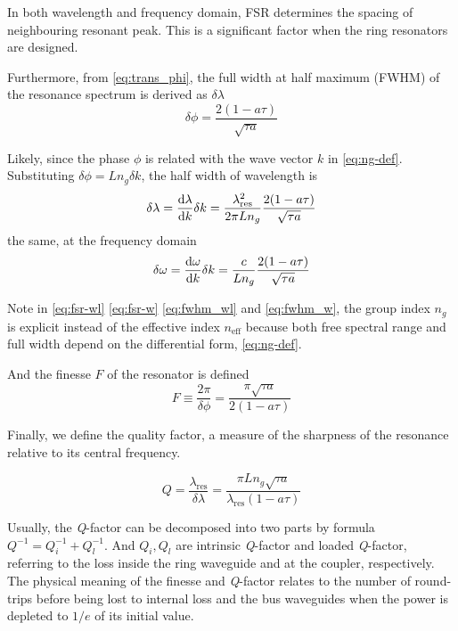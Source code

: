 In both wavelength and frequency domain, FSR determines the spacing of neighbouring resonant peak. This is a significant factor when the ring resonators are designed.

Furthermore, from \autoref{eq:trans_phi}, the full width at half maximum (FWHM) of the resonance spectrum is derived as $\delta\lambda$
\begin{equation}\label{eq:fwhm_phi}
    \delta\phi = \frac{2(1- a \tau)}{\sqrt{\tau a}}
\end{equation}
\begin{figure}
    \centering
    
    \label{fig:my_label}
\end{figure}

Likely, since the phase $\phi$ is related with the wave vector $k$ in \autoref{eq:ng-def}. Substituting $\delta \phi = L n_g \delta k$, the half width of wavelength is
\begin{equation}
    \delta \lambda = \dv{\lambda}{k}\delta k = \frac{\lambda_\mathrm{res}^2}{2\pi L n_g} \frac{2(1- a \tau)}{\sqrt{\tau a}} \label{eq:fwhm_wl}
\end{equation}
the same, at the frequency domain
\begin{equation}
    \delta \omega = \dv{\omega}{k}\delta k = \frac{c}{ L n_g} \frac{2(1- a \tau)}{\sqrt{\tau a}} \label{eq:fwhm_w}
\end{equation}

Note in \autoref{eq:fsr-wl} \autoref{eq:fsr-w} \autoref{eq:fwhm_wl} and \autoref{eq:fwhm_w}, the group index $n_g$ is explicit instead of the effective index $n_\mathrm{eff}$ because both free spectral range and full width depend on the differential form, \autoref{eq:ng-def}.

And the finesse $F$ of the resonator is defined 
\begin{equation}
    F \equiv \frac{2\pi}{\delta\phi} = \frac{\pi\sqrt{\tau a}}{2(1- a \tau)}
\end{equation}

Finally, we define the quality factor, a measure of the sharpness of the resonance relative to its central frequency.

\begin{equation}\label{eq:q-def}
    Q = \frac{\lambda_\mathrm{res}}{\delta \lambda} =  \frac{\pi L n_g \sqrt{\tau a}} {\lambda_\mathrm{res} (1- a \tau)}
\end{equation}

Usually, the \textit{Q}-factor can be decomposed into two parts by formula $Q^{-1}=Q_{i}^{-1} + Q_{l}^{-1}$. And $Q_{i}, Q_{l}$ are intrinsic \textit{Q}-factor and loaded \textit{Q}-factor, referring to the loss inside the ring waveguide and at the coupler, respectively. The physical meaning of the finesse and \textit{Q}-factor relates to the number of round-trips before being lost to internal loss and the bus waveguides when the power is depleted to $1/e$ of its initial value.

